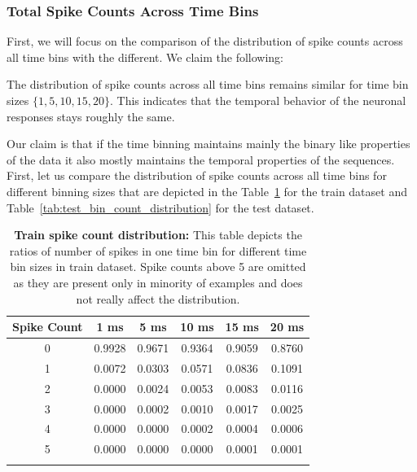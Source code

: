 \subsubsection{Total Spike Counts Across Time Bins}
\label{subsubsec:spike_counts_time_bins}

First, we will focus on the comparison of the distribution of spike counts across all time bins with the different. We claim the following:

\begin{claim}
    The distribution of spike counts across all time bins remains similar for time bin sizes $\{1, 5, 10, 15, 20\}$. This indicates that the temporal behavior of the neuronal responses stays roughly the same.
\end{claim}
\label{claim:tim_bin_counts}

Our claim is that if the time binning maintains mainly the binary like properties of the data it also mostly maintains the temporal properties of the sequences. First, let us compare the distribution of spike counts across all time bins for different binning sizes that are depicted in the Table~\ref{tab:train_bin_count_distribution} for the train dataset and Table~\ref{tab:test_bin_count_distribution} for the test dataset.

\begin{table}
    \centering\footnotesize\sf
    \begin{tabular}{cccccc}
    \toprule
        Spike Count & 1 ms & 5 ms & 10 ms & 15 ms & 20 ms \\
    \midrule
        0 & 0.9928 & 0.9671 & 0.9364 & 0.9059 & 0.8760 \\
        1 & 0.0072 & 0.0303 & 0.0571 & 0.0836 & 0.1091 \\
        2 & 0.0000 & 0.0024 & 0.0053 & 0.0083 & 0.0116 \\
        3 & 0.0000 & 0.0002 & 0.0010 & 0.0017 & 0.0025 \\
        4 & 0.0000 & 0.0000 & 0.0002 & 0.0004 & 0.0006 \\
        5 & 0.0000 & 0.0000 & 0.0000 & 0.0001 & 0.0001 \\
    \addlinespace %
    \bottomrule
    \end{tabular}
    \caption{\textbf{Train spike count distribution:} This table depicts the ratios of number of spikes in one time bin for different time bin sizes in train dataset. Spike counts above 5 are omitted as they are present only in minority of examples and does not really affect the distribution.}
    \label{tab:train_bin_count_distribution}
\end{table}
    

